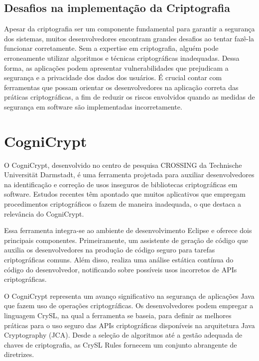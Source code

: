 \subsection{Desafios na implementação da Criptografia} 

Apesar da criptografia ser um componente fundamental para garantir a segurança dos sistemas, muitos desenvolvedores encontram grandes desafios ao tentar fazê-la funcionar corretamente. Sem a expertise em criptografia, alguém pode erroneamente utilizar algoritmos e técnicas criptográficas inadequadas. Dessa forma, as aplicações podem apresentar vulnerabilidades que prejudicam a segurança e a privacidade dos dados dos usuários. É crucial contar com ferramentas que possam orientar os desenvolvedores na aplicação correta das práticas criptográficas, a fim de reduzir os riscos envolvidos quando as medidas de segurança em software são implementadas incorretamente.


\section{CogniCrypt} %

O CogniCrypt, desenvolvido no centro de pesquisa CROSSING da Technische Universität Darmstadt, é uma ferramenta projetada para auxiliar desenvolvedores na identificação e correção de usos inseguros de bibliotecas criptográficas em software. Estudos recentes têm apontado que muitos aplicativos que empregam procedimentos criptográficos o fazem de maneira inadequada, o que destaca a relevância do CogniCrypt.

Essa ferramenta integra-se ao ambiente de desenvolvimento Eclipse e oferece dois principais componentes. Primeiramente, um assistente de geração de código que auxilia os desenvolvedores na produção de código seguro para tarefas criptográficas comuns. Além disso, realiza uma análise estática contínua do código do desenvolvedor, notificando sobre possíveis usos incorretos de APIs criptográficas.

O CogniCrypt representa um avanço significativo na segurança de aplicações Java que fazem uso de operações criptográficas. Os desenvolvedores podem empregar a linguagem CrySL, na qual a ferramenta se baseia, para definir as melhores práticas para o uso seguro das APIs criptográficas disponíveis na arquitetura Java Cryptography (JCA). Desde a seleção de algoritmos até a gestão adequada de chaves de criptografia, as CrySL Rules fornecem um conjunto abrangente de diretrizes.

